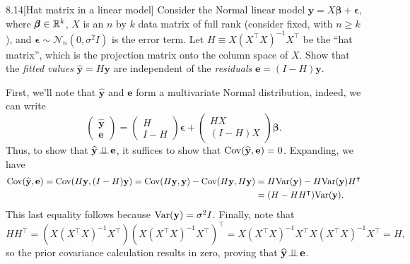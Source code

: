 \documentclass{pset}
\begin{document}
\begin{problem}{8.14}[Hat matrix in a linear model] Consider the Normal linear model $\mathbf{y} = X\pmb{\beta}+\pmb{\epsilon}$, where $\pmb{\beta}\in \mathbb{R}^k$, $X$ is an $n$ by $k$ data matrix of full rank (consider fixed, with $n\geq k$), and $\pmb{\epsilon}\sim \mathcal{N}_n(0, \sigma^2I)$ is the error term. Let $H\equiv X(X^\intercal X)^{-1}X^\intercal$ be the ``hat matrix'', which is the projection matrix onto the column space of $X$. 
Show that the \emph{fitted values} $\widehat{\mathbf{y}}=H\mathbf{y}$ are independent of the \emph{residuals} $\mathbf{e}=(I-H)\mathbf{y}$.
\end{problem}

\begin{solution}
  First, we'll note that $\widehat{\mathbf{y}}$ and $\mathbf{e}$ form a multivariate Normal distribution, indeed, we can write
  \[
    \begin{pmatrix}\widehat{\mathbf{y}}\\\mathbf{e}\end{pmatrix} =\begin{pmatrix}H\\I-H\end{pmatrix}\pmb{\epsilon} + \begin{pmatrix}HX\\(I-H)X\end{pmatrix}\pmb{\beta}.
  \]
  Thus, to show that $\widehat{\mathbf{y}}\!\perp\!\!\!\perp\! \mathbf{e}$, it suffices to show that $\textrm{Cov}(\widehat{\mathbf{y}}, \mathbf{e})=0$. Expanding, we have 
  \[\begin{aligned}
    \textrm{Cov}(\widehat{\mathbf{y}}, \mathbf{e}) = \textrm{Cov}(H\mathbf{y}, (I-H)\mathbf{y}) = \textrm{Cov}(H\mathbf{y}, \mathbf{y}) - \textrm{Cov}(H\mathbf{y}, H\mathbf{y}) &= H\textrm{Var}(\mathbf{y})-H\textrm{Var}(\mathbf{y})H^\intercal\\ &= (H-HH^\intercal)\textrm{Var}(\mathbf{y}).
  \end{aligned}\]
  This last equality follows because $\textrm{Var}(\mathbf{y})=\sigma^2 I$. Finally, note that
  \[
    HH^\intercal = \left(X(X^\intercal X)^{-1}X^\intercal\right)\left(X(X^\intercal X)^{-1}X^\intercal\right)^\intercal = X(X^\intercal X)^{-1}X^\intercal X (X^\intercal X)^{-1} X^\intercal = H,
  \]
  so the prior covariance calculation results in zero, proving that $\widehat{\mathbf{y}}\!\perp\!\!\!\perp\! \mathbf{e}$.
\end{solution}
\end{document}
